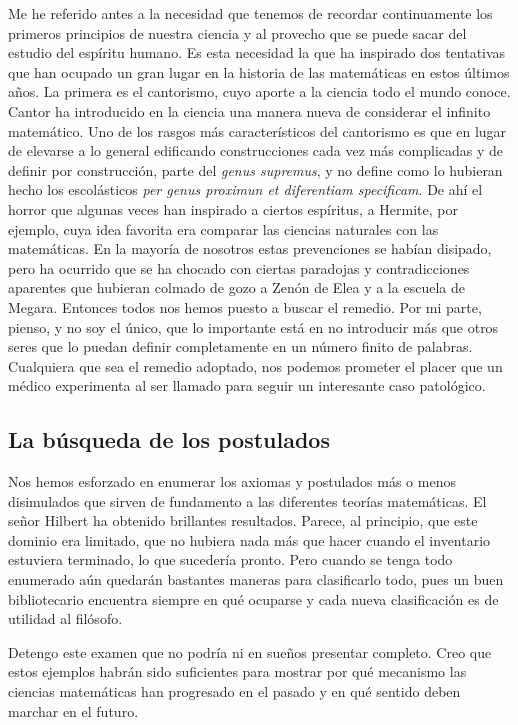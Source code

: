 \documentclass[a4paper, 12pt]{article}
\begin{document}
Me he referido antes a la necesidad que tenemos de recordar continuamente
los primeros principios de nuestra ciencia y al provecho que se puede sacar
del estudio del espíritu humano. Es esta necesidad la que ha inspirado
dos tentativas que han ocupado un gran lugar en la historia de las matemáticas en estos últimos años. La primera es el cantorismo, cuyo
aporte a la ciencia todo el mundo conoce. Cantor ha introducido en la
ciencia una manera nueva de considerar el infinito matemático. Uno de
los rasgos más característicos del cantorismo es que en lugar de
elevarse a lo general edificando construcciones cada vez más complicadas
y de definir por construcción, parte del \textit{genus supremus}, y no define
como lo hubieran hecho los escolásticos \textit{per genus proximun et
diferentiam specificam}. De ahí el horror que algunas veces han
inspirado a ciertos espíritus, a Hermite, por ejemplo, cuya idea
favorita era comparar las ciencias naturales con las matemáticas. En la
mayoría de nosotros estas prevenciones se habían disipado, pero ha
ocurrido que se ha chocado con ciertas paradojas y contradicciones aparentes
que hubieran colmado de gozo a Zenón de Elea y a la escuela de Megara. Entonces todos
nos hemos puesto a buscar el remedio. Por mi parte, pienso, y no soy el único, que lo importante está en no introducir más que otros seres
que lo puedan definir completamente en un número finito de palabras.
Cualquiera que sea el remedio adoptado, nos podemos prometer el placer que
un médico experimenta al ser llamado para seguir un interesante caso
patológico.


\subsection*{La búsqueda de los postulados}


Nos hemos esforzado en enumerar los axiomas y postulados
más o menos disimulados que sirven de fundamento a las
diferentes teorías matemáticas. El señor Hilbert ha obtenido
brillantes resultados. Parece, al principio, que este dominio
era limitado, que no hubiera nada más que hacer cuando el
inventario estuviera terminado, lo que sucedería pronto.
Pero cuando se tenga todo enumerado aún quedarán bastantes
maneras para clasificarlo todo, pues un buen bibliotecario
encuentra siempre en qué ocuparse y cada nueva clasificación
es de  utilidad al filósofo.

Detengo este examen que no podría ni en sueños presentar
completo. Creo que estos ejemplos habrán sido suficientes
para mostrar por qué mecanismo las ciencias matemáticas han progresado
en el pasado y en qué sentido deben marchar en el futuro.
\end{document}

